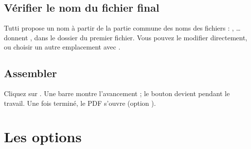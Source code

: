 
\subsection{Vérifier le nom du fichier final}
Tutti propose un nom à partir de la partie commune des noms des fichiers :
, … donnent
, dans le dossier du premier fichier. Vous pouvez le
modifier directement, ou choisir un autre emplacement avec .

\subsection{Assembler}
Cliquez sur . Une barre montre l'avancement ; le bouton devient
 pendant le travail. Une fois terminé, le PDF s'ouvre (option
).


\section{Les options}\label{sec:options}

